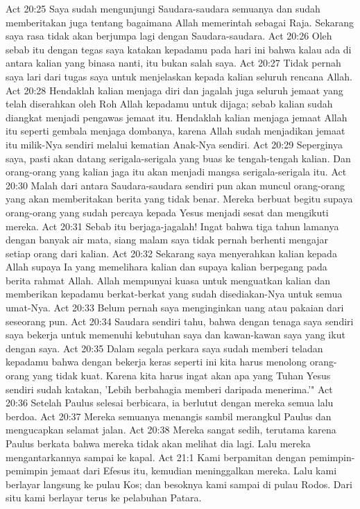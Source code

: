 Act 20:25  Saya sudah mengunjungi Saudara-saudara semuanya dan sudah memberitakan juga tentang bagaimana Allah memerintah sebagai Raja. Sekarang saya rasa tidak akan berjumpa lagi dengan Saudara-saudara.
Act 20:26  Oleh sebab itu dengan tegas saya katakan kepadamu pada hari ini bahwa kalau ada di antara kalian yang binasa nanti, itu bukan salah saya.
Act 20:27  Tidak pernah saya lari dari tugas saya untuk menjelaskan kepada kalian seluruh rencana Allah.
Act 20:28  Hendaklah kalian menjaga diri dan jagalah juga seluruh jemaat yang telah diserahkan oleh Roh Allah kepadamu untuk dijaga; sebab kalian sudah diangkat menjadi pengawas jemaat itu. Hendaklah kalian menjaga jemaat Allah itu seperti gembala menjaga dombanya, karena Allah sudah menjadikan jemaat itu milik-Nya sendiri melalui kematian Anak-Nya sendiri.
Act 20:29  Seperginya saya, pasti akan datang serigala-serigala yang buas ke tengah-tengah kalian. Dan orang-orang yang kalian jaga itu akan menjadi mangsa serigala-serigala itu.
Act 20:30  Malah dari antara Saudara-saudara sendiri pun akan muncul orang-orang yang akan memberitakan berita yang tidak benar. Mereka berbuat begitu supaya orang-orang yang sudah percaya kepada Yesus menjadi sesat dan mengikuti mereka.
Act 20:31  Sebab itu berjaga-jagalah! Ingat bahwa tiga tahun lamanya dengan banyak air mata, siang malam saya tidak pernah berhenti mengajar setiap orang dari kalian.
Act 20:32  Sekarang saya menyerahkan kalian kepada Allah supaya Ia yang memelihara kalian dan supaya kalian berpegang pada berita rahmat Allah. Allah mempunyai kuasa untuk menguatkan kalian dan memberikan kepadamu berkat-berkat yang sudah disediakan-Nya untuk semua umat-Nya.
Act 20:33  Belum pernah saya menginginkan uang atau pakaian dari seseorang pun.
Act 20:34  Saudara sendiri tahu, bahwa dengan tenaga saya sendiri saya bekerja untuk memenuhi kebutuhan saya dan kawan-kawan saya yang ikut dengan saya.
Act 20:35  Dalam segala perkara saya sudah memberi teladan kepadamu bahwa dengan bekerja keras seperti ini kita harus menolong orang-orang yang tidak kuat. Karena kita harus ingat akan apa yang Tuhan Yesus sendiri sudah katakan, 'Lebih berbahagia memberi daripada menerima.'"
Act 20:36  Setelah Paulus selesai berbicara, ia berlutut dengan mereka semua lalu berdoa.
Act 20:37  Mereka semuanya menangis sambil merangkul Paulus dan mengucapkan selamat jalan.
Act 20:38  Mereka sangat sedih, terutama karena Paulus berkata bahwa mereka tidak akan melihat dia lagi. Lalu mereka mengantarkannya sampai ke kapal.
Act 21:1  Kami berpamitan dengan pemimpin-pemimpin jemaat dari Efesus itu, kemudian meninggalkan mereka. Lalu kami berlayar langsung ke pulau Kos; dan besoknya kami sampai di pulau Rodos. Dari situ kami berlayar terus ke pelabuhan Patara.
